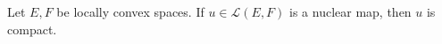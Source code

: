 Let $E, F$ be locally convex spaces. If $u \in \mathcal{L}(E, F)$ is a nuclear map, then $u$ is compact.
